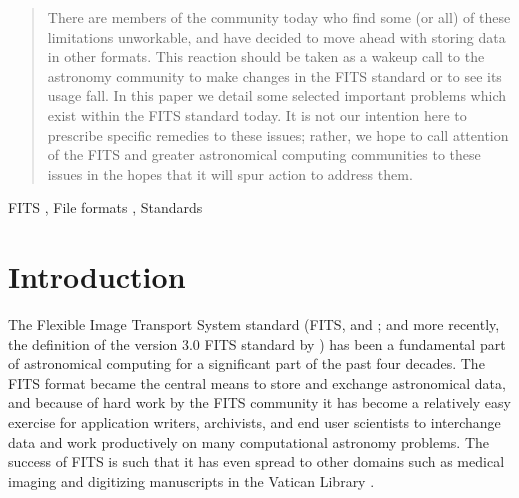 \documentclass[final,authoryear,5p,times,twocolumn]{elsarticle}
\begin{document}
\begin{frontmatter}
\begin{abstract}
There are members of the community today who find some (or all) of
these limitations unworkable, and have decided to move ahead with
storing data in other formats. This reaction should be taken as a
wakeup call to the astronomy community to make changes in the FITS
standard or to see its usage fall. In this paper we detail some
selected important problems which exist within the FITS standard
today. It is not our intention here to prescribe specific remedies to
these issues; rather, we hope to call attention of the FITS and
greater astronomical computing communities to these issues in the
hopes that it will spur action to address them.

\end{abstract}

\begin{keyword}


FITS \sep
File formats \sep
Standards

\end{keyword}

\end{frontmatter}


\newcommand{\aspconf}{ASP Conf.\ Ser}
\newcommand{\aap}{A\&A}
\newcommand{\aaps}{A\&AS}
\newcommand{\jrasc}{JRASC}
\newcommand{\qjras}{QJRAS}
\newcommand{\mnras}{MNRAS}
\newcommand{\pasp}{PASP}
\newcommand{\pasa}{PASA}

\section{Introduction}


The Flexible Image Transport System standard (FITS,
\citealt{1979ipia.coll..445W,1981A&AS...44..363W} and \citealt{2001A&A...376..359H}; and
more recently, the definition of the version 3.0 FITS standard by
\citealt{2010A&A...524A..42P}) has been a fundamental part of
astronomical computing for a significant part of the past four
decades. The FITS format became the central means to store and
exchange astronomical data, and because of hard work by the FITS
community it has become a relatively easy exercise for application
writers, archivists, and end user scientists to interchange data and
work productively on many computational astronomy problems. The
success of FITS is such that it has even spread to other domains such
as medical imaging and digitizing manuscripts in the Vatican Library
\citep{2006JRASC.100..242W,2012EWASSAlle}.
\end{document}
